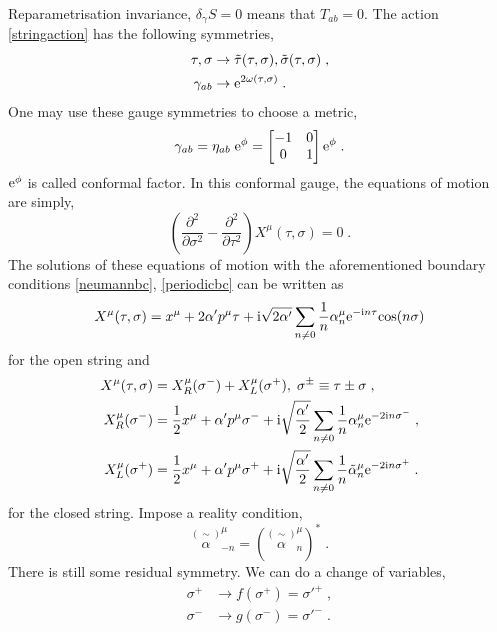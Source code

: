 \documentclass[11pt]{article} %
\begin{document}
Reparametrisation invariance, $\delta_{\gamma}S = 0$ means that $T_{ab} = 0$.\newline
The action \eqref{stringaction} has the following symmetries,
\begin{align}
	\tau, \sigma &\rightarrow \tilde{\tau}(\tau, \sigma), \tilde{\sigma}(\tau,\sigma)\;,\\
	\gamma_{ab} &\rightarrow \mathrm{e}^{2\omega(\tau,\sigma)}\;.
\end{align}
One may use these gauge symmetries to choose a metric,
\begin{equation}
	\gamma_{ab} = \eta_{ab}\;\mathrm{e}^{\phi} = 
	\begin{bmatrix}
		-1&0\\
		0&1
	\end{bmatrix}
	\mathrm{e}^{\phi}\;.
\end{equation}
$\mathrm{e}^{\phi}$ is called conformal factor. In this conformal gauge, the equations of motion are simply,
\begin{equation}
	\left( \dfrac{\partial^2}{\partial\sigma^2} - \dfrac{\partial^2}{\partial\tau^2}	\right) X^{\mu}(\tau, \sigma)=0\;.
\end{equation}
The solutions of these equations of motion with the aforementioned boundary conditions \eqref{neumannbc}, \eqref{periodicbc} can be written as
\begin{equation}
	X^{\mu}(\tau,\sigma) = x^{\mu} + 2\alpha'p^{\mu}\tau + \mathrm{i}  \sqrt{2\alpha'}\sum_{n\neq0} \dfrac{1}{n} \alpha_n^{\mu}\mathrm{e}^{-\mathrm{i} n\tau}\mathrm{cos}(n\sigma)
\end{equation}
for the open string and
\begin{align}
	X^{\mu}(\tau,\sigma) &= X^{\mu}_R(\sigma^-) + X^{\mu}_L(\sigma^+), \; \sigma^{\pm} \equiv \tau\pm\sigma\;,\\
	X^{\mu}_R(\sigma^-)&= \dfrac{1}{2}x^{\mu} + \alpha'p^{\mu}\sigma^- + \mathrm{i} \sqrt{\dfrac{\alpha'}{2}} \sum_{n\neq0}\dfrac{1}{n}\alpha^{\mu}_n\mathrm{e}^{-2\mathrm{i} n\sigma^-}\;,\\
	X^{\mu}_L(\sigma^+)&= \dfrac{1}{2}x^{\mu} + \alpha'p^{\mu}\sigma^+ + \mathrm{i} \sqrt{\dfrac{\alpha'}{2}} \sum_{n\neq0}\dfrac{1}{n}\tilde{\alpha}^{\mu}_n\mathrm{e}^{-2\mathrm{i} n\sigma^+}\;.
\end{align}
for the closed string. Impose a reality condition,
\begin{equation}
	\overset{(\sim)}{\alpha}^{\mu}_{-n} = \left( \overset{(\sim)}{\alpha}^{\mu}_n \right)^* \;.
\end{equation}
There is still some residual symmetry. We can do a change of variables,
\begin{align}
	\sigma^+&\rightarrow f(\sigma^+) = \sigma'^+\;,\\
	\sigma^-&\rightarrow g(\sigma^-) = \sigma'^-\;.
\end{align}
\end{document}
